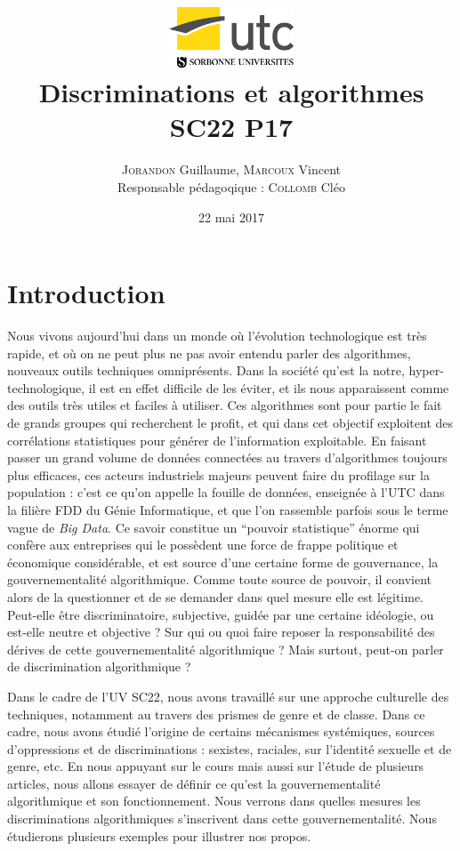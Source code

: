 \documentclass[a4paper,12pt]{report}
\author{\textsc{Jorandon} Guillaume, \textsc{Marcoux} Vincent\\\small{Responsable pédagoqique : \textsc{Collomb} Cléo}}
\date{22 mai 2017}
\title{\includegraphics[width=140px]{utc.jpg}\\\vspace{25mm}Discriminations et algorithmes\\\normalsize{SC22 P17}}
\begin{document}
\hypersetup{pageanchor=false}
\maketitle
\tableofcontents
\hypersetup{pageanchor=true}
\chapter*{Introduction}
Nous vivons aujourd'hui dans un monde où l'évolution technologique est très rapide, et où on ne peut plus ne pas avoir entendu parler des algorithmes, nouveaux outils techniques omniprésents. Dans la société qu'est la notre, hyper-technologique, il est en effet difficile de les éviter, et ils nous apparaissent comme des outils très utiles et faciles à utiliser. Ces algorithmes sont pour partie le fait de grands groupes qui recherchent le profit, et qui dans cet objectif exploitent des corrélations statistiques pour générer de l'information exploitable. En faisant passer un grand volume de données connectées au travers d'algorithmes toujours plus efficaces, ces acteurs industriels majeurs peuvent faire du profilage sur la population : c'est ce qu'on appelle la fouille de données, enseignée à l'UTC dans la filière FDD du Génie Informatique, et que l'on rassemble parfois sous le terme vague de \textit{Big Data}. Ce savoir constitue un ``pouvoir statistique'' énorme qui confère aux entreprises qui le possèdent une force de frappe politique et économique considérable, et est source d'une certaine forme de gouvernance, la gouvernementalité algorithmique. Comme toute source de pouvoir, il convient alors de la questionner et de se demander dans quel mesure elle est légitime. Peut-elle être discriminatoire, subjective, guidée par une certaine idéologie, ou est-elle neutre et objective ? Sur qui ou quoi faire reposer la responsabilité des dérives de cette gouvernementalité algorithmique ? Mais surtout, peut-on parler de discrimination algorithmique ? 

Dans le cadre de l'UV SC22, nous avons travaillé sur une approche culturelle des techniques, notamment au travers des prismes de genre et de classe. Dans ce cadre, nous avons étudié l'origine de certains mécanismes systémiques, sources d'oppressions et de discriminations : sexistes, raciales, sur l'identité sexuelle et de genre, etc. En nous appuyant sur le cours mais aussi sur l'étude de plusieurs articles, nous allons essayer de définir ce qu'est la gouvernementalité algorithmique et son fonctionnement. Nous verrons dans quelles mesures les discriminations algorithmiques s'inscrivent dans cette gouvernementalité. Nous étudierons plusieurs exemples pour illustrer nos propos.
\end{document}
